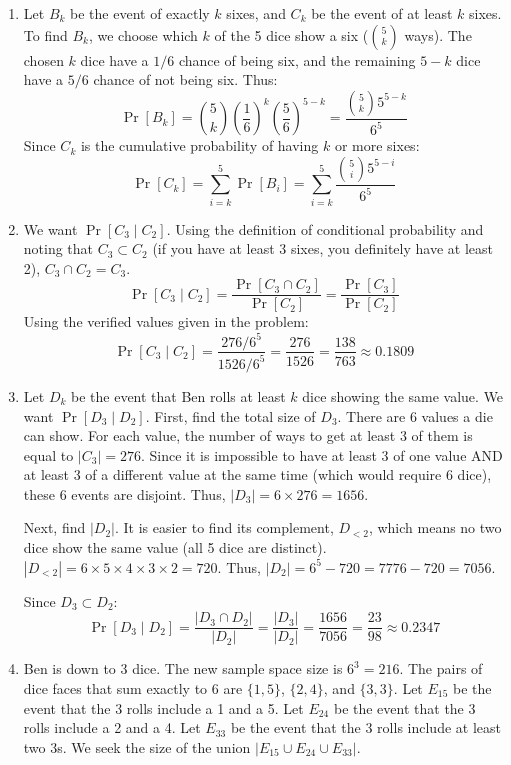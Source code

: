 \documentclass[11pt]{article}
\begin{document}
\begin{enumerate}[label=\textbf{(\alph*)}]
    Because a bijection exists between $A_{18}$ and its complement, both sets must have the exact same number of elements. Thus, $|A_{18}| = \frac{1}{2} |S_{total}|$, which means:
    $$ \Pr[A_{18}] = \frac{1}{2} $$

    \item Let $B_k$ be the event of exactly $k$ sixes, and $C_k$ be the event of at least $k$ sixes. 
    To find $B_k$, we choose which $k$ of the 5 dice show a six ($\binom{5}{k}$ ways). The chosen $k$ dice have a $1/6$ chance of being six, and the remaining $5-k$ dice have a $5/6$ chance of not being six. Thus:
    $$ \Pr[B_k] = \binom{5}{k} \left(\frac{1}{6}\right)^k \left(\frac{5}{6}\right)^{5-k} = \frac{\binom{5}{k} 5^{5-k}}{6^5} $$
    Since $C_k$ is the cumulative probability of having $k$ or more sixes:
    $$ \Pr[C_k] = \sum_{i=k}^5 \Pr[B_i] = \sum_{i=k}^5 \frac{\binom{5}{i} 5^{5-i}}{6^5} $$

    \item We want $\Pr[C_3 \mid C_2]$. Using the definition of conditional probability and noting that $C_3 \subset C_2$ (if you have at least 3 sixes, you definitely have at least 2), $C_3 \cap C_2 = C_3$.
    $$ \Pr[C_3 \mid C_2] = \frac{\Pr[C_3 \cap C_2]}{\Pr[C_2]} = \frac{\Pr[C_3]}{\Pr[C_2]} $$
    Using the verified values given in the problem:
    $$ \Pr[C_3 \mid C_2] = \frac{276/6^5}{1526/6^5} = \frac{276}{1526} = \frac{138}{763} \approx 0.1809 $$

    \item Let $D_k$ be the event that Ben rolls at least $k$ dice showing the same value. We want $\Pr[D_3 \mid D_2]$. 
    First, find the total size of $D_3$. There are 6 values a die can show. For each value, the number of ways to get at least 3 of them is equal to $|C_3| = 276$. Since it is impossible to have at least 3 of one value AND at least 3 of a different value at the same time (which would require 6 dice), these 6 events are disjoint. 
    Thus, $|D_3| = 6 \times 276 = 1656$.
    
    Next, find $|D_2|$. It is easier to find its complement, $D_{<2}$, which means no two dice show the same value (all 5 dice are distinct). 
    $|D_{<2}| = 6 \times 5 \times 4 \times 3 \times 2 = 720$. 
    Thus, $|D_2| = 6^5 - 720 = 7776 - 720 = 7056$.

    Since $D_3 \subset D_2$:
    $$ \Pr[D_3 \mid D_2] = \frac{|D_3 \cap D_2|}{|D_2|} = \frac{|D_3|}{|D_2|} = \frac{1656}{7056} = \frac{23}{98} \approx 0.2347 $$

    \item Ben is down to 3 dice. The new sample space size is $6^3 = 216$. The pairs of dice faces that sum exactly to 6 are $\{1,5\}$, $\{2,4\}$, and $\{3,3\}$. 
    Let $E_{15}$ be the event that the 3 rolls include a 1 and a 5.
    Let $E_{24}$ be the event that the 3 rolls include a 2 and a 4.
    Let $E_{33}$ be the event that the 3 rolls include at least two 3s.
    We seek the size of the union $|E_{15} \cup E_{24} \cup E_{33}|$. 
    

\end{enumerate}
\end{document}
